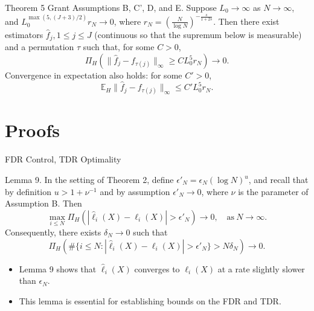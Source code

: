 \documentclass[10pt, aspectratio=169]{beamer}
\begin{document}
   \begin{frame}
    \begin{mytheorembox}{Theorem 5}
        Grant Assumptions B, C', D, and E. Suppose \( L_0 \to \infty \) as \( N \to \infty \), and \( L_0^{\max(5, (J+3)/2)} r_N \to 0 \), where \( r_N = \left( \frac{N}{\log N} \right)^{-\frac{s}{1 + 2s}} \). Then there exist estimators \( \hat{f}_j, 1 \leq j \leq J \) (continuous so that the supremum below is measurable) and a permutation \( \tau \) such that, for some \( C > 0 \),
        \[
        \Pi_H \left( \| \hat{f}_j - f_{\tau(j)} \|_\infty \geq C L_0^5 r_N \right) \to 0.
        \]
        Convergence in expectation also holds: for some \( C' > 0 \),
        \[
        \mathbb{E}_H \| \hat{f}_j - f_{\tau(j)} \|_\infty \leq C' L_0^5 r_N.
        \]
    \end{mytheorembox}
\end{frame}
\section{Proofs}
\begin{frame}{FDR Control, TDR Optimality}

    \begin{mytheorembox}{Lemma 9.}
        In the setting of Theorem 2, define \(\epsilon'_N = \epsilon_N (\log N)^u\), and recall that by definition \(u > 1 + \nu^{-1}\) and by assumption \(\epsilon'_N \to 0\), where \(\nu\) is the parameter of Assumption B. Then
        \[
        \max_{i \leq N} \Pi_H(|\hat{\ell}_i(X) - \ell_i(X)| > \epsilon'_N) \to 0, \quad \text{as} \ N \to \infty. \tag{20}
        \] 
        Consequently, there exists \(\delta_N \to 0\) such that
        \[
        \Pi_H\left(\#\{i \leq N : |\hat{\ell}_i(X) - \ell_i(X)| > \epsilon'_N\} > N \delta_N \right) \to 0.
        \]
    \end{mytheorembox}
    \begin{itemize}[label=\scalebox{0.5}{$\blacksquare$}]
        \item Lemma 9 shows that \(\hat{\ell}_i(X)\) converges to \(\ell_i(X)\) at a rate slightly slower than \(\epsilon_N\).
        \item This lemma is essential for establishing bounds on the FDR and TDR.
    \end{itemize}
\end{frame}
\end{document}
